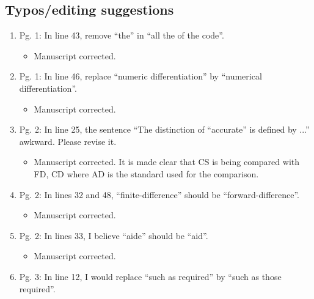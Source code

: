 \documentclass{article}
\begin{document}
\subsection*{Typos/editing suggestions}
\begin{enumerate}

\item Pg. 1: In line 43, remove “the” in “all the of the code”.

{\color{red}  
\begin{itemize}
     \item
      Manuscript corrected.
  \end{itemize}}

 \item Pg. 1: In line 46, replace “numeric differentiation” by “numerical differentiation”.

{\color{red}  
\begin{itemize}
     \item
      Manuscript corrected.
  \end{itemize}}

 \item Pg. 2: In line 25, the sentence “The distinction of “accurate” is deﬁned by ...”
awkward. Please revise it.

{\color{red}  
\begin{itemize}
     \item
      Manuscript corrected. It is made clear that CS is being compared with FD, CD where AD is the standard used for the comparison.
  \end{itemize}}

 \item Pg. 2: In lines 32 and 48, “ﬁnite-difference” should be “forward-difference”.

{\color{red}  
\begin{itemize}
     \item
      Manuscript corrected.
  \end{itemize}}

 \item Pg. 2: In lines 33, I believe “aide” should be “aid”.

{\color{red}  
\begin{itemize}
     \item
    Manuscript corrected.
  \end{itemize}}

 \item Pg. 3: In line 12, I would replace “such as required” by “such as those required”.


\end{enumerate}
\end{document}
